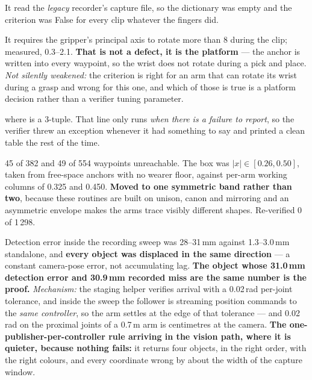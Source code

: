{It read the \emph{legacy} recorder's capture file, so the dictionary was empty
and the criterion was False for every clip whatever the fingers did.}

{It requires the gripper's principal axis to rotate more than 8\dg{} during the
clip; measured, 0.3--2.1\dg. \textbf{That is not a defect, it is the platform}
--- the anchor is written into every waypoint, so the wrist does not rotate
during a pick and place. \textit{Not silently weakened:} the criterion is right
for an arm that can rotate its wrist during a grasp and wrong for this one, and
which of those is true is a platform decision rather than a verifier tuning
parameter.}

{ where  is a 3-tuple. That line only
runs \emph{when there is a failure to report}, so the verifier threw an
exception whenever it had something to say and printed a clean table the rest of
the time.}

{45 of 382 and 49 of 554 waypoints unreachable. The box was $|x| \in [0.26,
0.50]$, taken from free-space anchors with no wearer floor, against per-arm
working columns of 0.325 and 0.450. \textbf{Moved to one symmetric band rather
than two}, because these routines are built on unison, canon and mirroring and
an asymmetric envelope makes the arms trace visibly different shapes. Re-verified
0 of 1\,298.}


{Detection error inside the recording sweep was 28--31\,mm against 1.3--3.0\,mm
standalone, and \textbf{every object was displaced in the same direction} ---
a constant camera-pose error, not accumulating lag. \textbf{The object whose
31.0\,mm detection error and 30.9\,mm recorded miss are the same number is the
proof.} \textit{Mechanism:} the staging helper verifies arrival with a 0.02\,rad
per-joint tolerance, and inside the sweep the follower is streaming position
commands to the \emph{same controller}, so the arm settles at the edge of that
tolerance --- and 0.02\,rad on the proximal joints of a 0.7\,m arm is
centimetres at the camera. \textbf{The one-publisher-per-controller rule
arriving in the vision path, where it is quieter, because nothing fails:} it
returns four objects, in the right order, with the right colours, and every
coordinate wrong by about the width of the capture window.}

